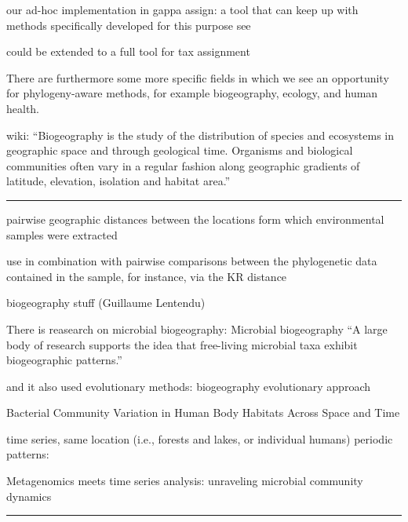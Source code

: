our ad-hoc implementation in gappa assign:
a tool that can keep up with methods specifically developed for this purpose
\cite{Lindgreen2016,Sczyrba2017,Almeida2018}
see 

could be extended to a full tool for tax assignment



There are furthermore some more specific fields in which we see an opportunity for phylogeny-aware methods,
for example biogeography, ecology, and human health.




wiki:
``Biogeography is the study of the distribution of species and ecosystems in geographic space and through geological time.
Organisms and biological communities often vary in a regular fashion along geographic gradients of latitude, elevation, isolation and habitat area.''





\noindent\rule{\textwidth}{0.4pt}

pairwise geographic distances between the locations form which environmental samples were extracted

use in combination with pairwise comparisons between the phylogenetic data contained in the sample, for instance, via the KR distance


biogeography stuff (Guillaume Lentendu)

There is reasearch on microbial biogeography:
Microbial biogeography \cite{HughesMartiny2006}
``A large body of research supports the idea that free-living microbial taxa exhibit biogeographic patterns.''

and it also used evolutionary methods:
biogeography evolutionary approach
\cite{Cox2016}

Bacterial Community Variation in Human Body Habitats Across Space and Time \cite{Costello2009}

time series, same location (i.e., forests and lakes, or individual humans)
periodic patterns:

Metagenomics meets time series analysis: unraveling microbial community dynamics \cite{Faust2015}


\noindent\rule{\textwidth}{0.4pt}

